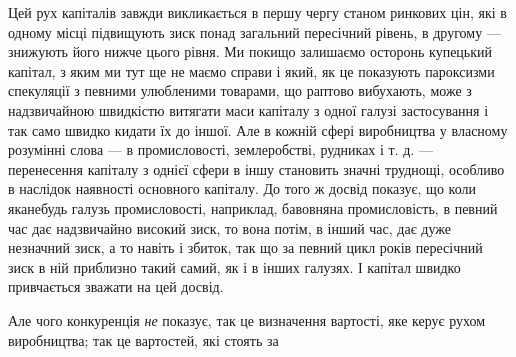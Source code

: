 Цей рух капіталів завжди викликається в першу чергу станом ринкових цін, які в одному місці
підвищують зиск понад загальний пересічний рівень, в другому — знижують його нижче цього рівня. Ми
покищо залишаємо осторонь купецький капітал, з яким ми тут ще не маємо справи і який, як це
показують пароксизми спекуляції з певними улюбленими товарами, що раптово вибухають, може з
надзвичайною швидкістю витягати маси капіталу з одної галузі застосування і так само швидко кидати
їх до іншої. Але в кожній сфері виробництва у власному розумінні слова — в промисловості,
землеробстві, рудниках і т. д. — перенесення капіталу з однієї сфери в іншу становить значні
труднощі, особливо в наслідок наявності основного капіталу. До того ж досвід показує, що коли
яканебудь галузь промисловості,
наприклад, бавовняна промисловість, в певний час дає надзвичайно високий зиск, то вона потім, в
інший час, дає дуже незначний зиск, а то навіть і збиток, так що за певний цикл років пересічний
зиск в ній приблизно такий самий, як і в інших галузях. І капітал швидко привчається зважати на цей
досвід.

Але чого конкуренція \emph{не} показує, так це визначення вартості, яке керує рухом виробництва; так це
вартостей, які стоять за
\parbreak{}  %
